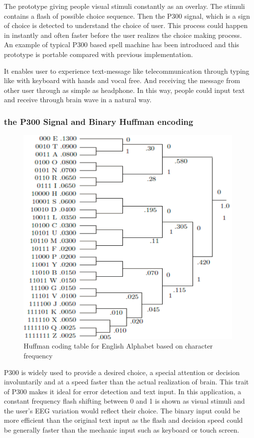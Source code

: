 \documentclass[a4paper]{article}
\begin{document}
The prototype giving people visual stimuli constantly as an overlay. The stimuli contains a flash of possible choice sequence. Then the P300 signal, which is a sign of choice is detected to understand the choice of user. This process could happen in instantly and often faster before the user realizes the choice making process. An example of typical P300 based spell machine has been introduced and this prototype is portable compared with previous implementation. 

It enables user to experience text-message like telecommunication through typing like with keyboard with hands and vocal free. And receiving the message from other user through as simple as headphone. In this way, people could input text and receive through brain wave in a natural way.

\subsubsection{the P300 Signal and Binary Huffman encoding}

\begin{figure}
	\centering
	\includegraphics[width=0.8 \linewidth]{Huffman}
	\caption{Huffman coding table for English Alphabet based on character frequency}
	\label{fig:huff}
\end{figure}

P300 is widely used to provide a desired choice, a special attention or decision involuntarily and at a speed faster than the actual realization of brain. This trait of P300 makes it ideal for error detection and text input. In this application, a constant frequency flash shifting between 0 and 1 is shown as visual stimuli and the user's EEG variation would reflect their choice. The binary input could be more efficient than the original text input as the flash and decision speed could be generally faster than the mechanic input such as keyboard or touch screen.
\end{document}
